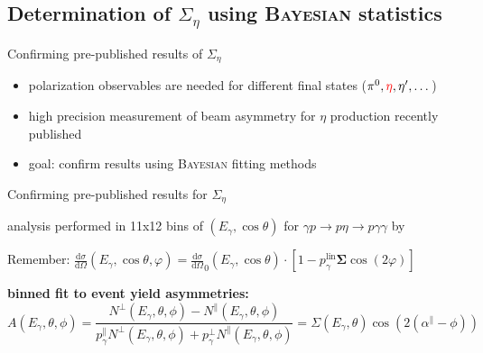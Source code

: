 \documentclass[11pt,aspectratio=169,dvipsnames]{beamer}
\newcommand{\thecolor}{black!70!blue}
\begin{document}
	\subsection{Determination of $\Sigma_\eta$ using \textsc{Bayesian} statistics}
		\begin{frame}{Confirming pre-published results of $\Sigma_\eta$}
		\begin{itemize}
			\item polarization observables are needed for different final states ($\pi^0,{\color{red}\eta},\eta',\dots$)
			\item high precision measurement of beam asymmetry for $\eta$ production recently published {\cites{eta}}
			\item goal: confirm results using \textsc{Bayesian} fitting methods
		\end{itemize}
		
	\end{frame}
	\begin{frame}{Confirming pre-published results for $\Sigma_\eta$}
		
		\begin{minipage}{\linewidth}
			\begin{tcolorbox}[colback=blue!5,colframe=\thecolor,title={Event selection ($\eta$)}]
				analysis performed in 11x12 bins of $(E_\gamma,\cos\theta)$ for $\gamma p\to p\eta\to p\gamma\gamma$ by {\cites{eta}}
			\end{tcolorbox}
		\end{minipage}
		\begin{minipage}{\linewidth}
			\begin{tcolorbox}[colback=blue!5,colframe=\thecolor,title={Methods}]
				\begin{center}
					Remember: $\frac{\text{d}\sigma}{\text{d}\Omega}(E_\gamma,\cos\theta,\varphi)=\frac{\text{d}\sigma}{\text{d}\Omega}_0(E_\gamma,\cos\theta)\cdot\left[1-p_\gamma^{\text{lin}}\boldsymbol{\Sigma}\cos(2\varphi)\right]$
				\end{center}
				

					\textbf{binned fit to event yield asymmetries:}
					$$A(E_\gamma,\theta,\phi)=\frac{N^\bot(E_\gamma,\theta,\phi)-N^\parallel(E_\gamma,\theta,\phi)}{p_\gamma^\parallel N^\bot(E_\gamma,\theta,\phi) + p_\gamma^\bot N^\parallel(E_\gamma,\theta,\phi)}=\Sigma(E_\gamma,\theta)\cos\left(2\left(\alpha^\parallel-\phi\right)\right)$$
					
			\end{tcolorbox}
		\end{minipage}
	\end{frame}
\end{document}
